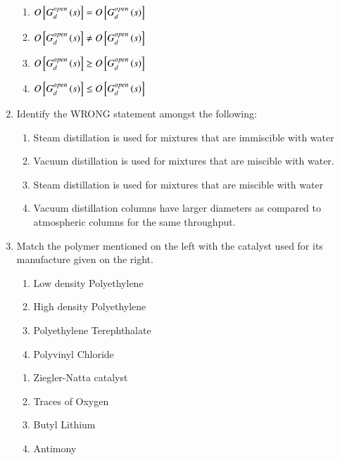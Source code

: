 \documentclass[journal,12pt,onecolumn]{IEEEtran}
\theoremstyle{remark}
\begin{document}
\begin{enumerate}
\hfill{}
\begin{enumerate}
    \item $O{}\left[G_d^{open}\left(s\right)\right] = O{}\left[G_d^{open}\left(s\right)\right]$
     \item $O{}\left[G_d^{open}\left(s\right)\right] \neq O{}\left[G_d^{open}\left(s\right)\right]$
      \item $O{}\left[G_d^{open}\left(s\right)\right] \geq O{}\left[G_d^{open}\left(s\right)\right]$
       \item $O{}\left[G_d^{open}\left(s\right)\right] \leq O{}\left[G_d^{open}\left(s\right)\right]$  
\end{enumerate}

    \item Identify the WRONG statement amongst the following:

\hfill{}
\begin{enumerate}
    \item Steam distillation is used for mixtures that are immiscible with water
    \item Vacuum distillation is used for mixtures that are miscible with water.
    \item Steam distillation is used for mixtures that are miscible with water
    \item Vacuum distillation columns have larger diameters as compared to atmospheric columns for the same throughput. 
\end{enumerate}

    \item Match the polymer mentioned on the left with the catalyst used for its manufacture given on the right.

\hfill{}
\begin{multicols}{2}
    \begin{enumerate}[label = \Roman*]
        \item Low density Polyethylene
        \item High density Polyethylene
        \item Polyethylene Terephthalate
        \item Polyvinyl Chloride 
    \end{enumerate}
\columnbreak
\begin{enumerate}[label = \Alph*]
    \item Ziegler-Natta catalyst
    \item Traces of Oxygen
    \item Butyl Lithium
    \item Antimony 
\end{enumerate}
\end{multicols}


\end{enumerate}
\end{document}
